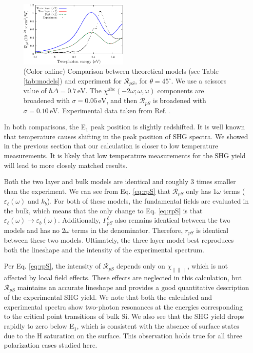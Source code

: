 \documentclass[prb,superscriptaddress,showpacs,twocolumn,letterpaper]{revtex4}
\begin{document}
\begin{figure}[b]
\centering
\includegraphics[width=0.48\textwidth]{fig4}
\caption{(Color online) Comparison between theoretical models (see Table
\ref{tab:models}) and experiment for $\mathcal{R}_{pS}$, for $\theta=45^\circ$.
We use a scissors value of $\hbar\Delta = 0.7\,\text{eV}$. The
$\chi^{\mathrm{abc}}(-2\omega;\omega,\omega)$ components are broadened with
$\sigma=0.05\,\text{eV}$, and then $\mathcal{R}_{pS}$ is broadened with
$\sigma=0.10\,\text{eV}$. Experimental data taken from Ref.
.\label{fig:mitchellRpS}}
\end{figure}

In both comparisons, the E$_{1}$ peak position is slightly redshifted. It is well
known that temperature causes shifting in the peak position of SHG
spectra.\cite{dadapPRB96} We showed in the previous section that our calculation
is closer to low temperature measurements. It is likely that low temperature
measurements for the SHG yield will lead to more closely matched results.

Both the two layer and bulk models are identical and roughly 3 times smaller
than the experiment. We can see from Eq. \eqref{eq:rpS} that $\mathcal{R}_{pS}$
only has $1\omega$ terms ($\varepsilon_{\ell}(\omega)$ and $k_{b}$). For both of
these models, the fundamental fields are evaluated in the bulk, which means that
the only change to Eq. \eqref{eq:rpS} is that $\varepsilon_{\ell}(\omega)
\rightarrow \varepsilon_{b}(\omega)$. Additionally, $\Gamma^{\ell}_{pS}$ also
remains identical between the two models and has no $2\omega$ terms in the
denominator. Therefore, $r_{pS}$ is identical between these two models.
Ultimately, the three layer model best reproduces both the lineshape and the
intensity of the experimental spectrum.

Per Eq. \eqref{eq:rpS}, the intensity of $\mathcal{R}_{pS}$ depends only on
$\chi_{\parallel\parallel\parallel}$, which is not affected by local field
effects.\cite{tancognedejean:tel-01235611} These effects are neglected in this
calculation, but $\mathcal{R}_{pS}$ maintains an accurate lineshape and provides
a good quantitative description of the experimental SHG yield. We note that both
the calculated and experimental spectra show two-photon resonances at the
energies corresponding to the critical point transitions of bulk Si. We also see
that the SHG yield drops rapidly to zero below E$_{1}$, which is consistent with
the absence of surface states due to the H saturation on the surface. This
observation holds true for all three polarization cases studied here.
\end{document}
